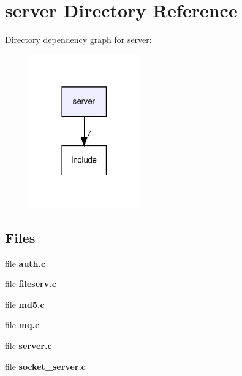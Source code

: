 \section{server Directory Reference}
\label{dir_41e1742e44e2de38b3bc91f993fed282}
Directory dependency graph for server\+:
\nopagebreak
\begin{figure}[H]
\begin{center}
\leavevmode
\includegraphics[width=134pt]{dir_41e1742e44e2de38b3bc91f993fed282_dep}
\end{center}
\end{figure}
\subsection*{Files}
\begin{DoxyCompactItemize}
\item 
file \textbf{ auth.\+c}
\item 
file \textbf{ fileserv.\+c}
\item 
file \textbf{ md5.\+c}
\item 
file \textbf{ mq.\+c}
\item 
file \textbf{ server.\+c}
\item 
file \textbf{ socket\+\_\+server.\+c}
\end{DoxyCompactItemize}
